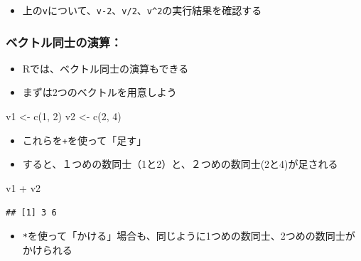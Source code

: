 \documentclass[
]{book}
\newenvironment{Shaded}{\begin{snugshade}}{\end{snugshade}}
\newcommand{\DecValTok}[1]{\textcolor[rgb]{0.00,0.00,0.81}{#1}}
\newcommand{\FunctionTok}[1]{\textcolor[rgb]{0.00,0.00,0.00}{#1}}
\newcommand{\NormalTok}[1]{#1}
\newcommand{\OtherTok}[1]{\textcolor[rgb]{0.56,0.35,0.01}{#1}}
\newcommand{\SpecialCharTok}[1]{\textcolor[rgb]{0.00,0.00,0.00}{#1}}
\providecommand{\tightlist}{%
  \setlength{\itemsep}{0pt}\setlength{\parskip}{0pt}}
\begin{document}
\begin{itemize}
\tightlist
\item
  上の\texttt{v}について、\texttt{v-2}、\texttt{v/2}、\texttt{v\^{}2}の実行結果を確認する
\end{itemize}

\hypertarget{ux30d9ux30afux30c8ux30ebux540cux58ebux306eux6f14ux7b97}{%
\subsubsection*{ベクトル同士の演算：}\label{ux30d9ux30afux30c8ux30ebux540cux58ebux306eux6f14ux7b97}}

\begin{itemize}
\tightlist
\item
  Rでは、ベクトル同士の演算もできる
\item
  まずは2つのベクトルを用意しよう
\end{itemize}

\begin{Shaded}
\begin{Highlighting}[]
\NormalTok{v1 }\OtherTok{\textless{}{-}} \FunctionTok{c}\NormalTok{(}\DecValTok{1}\NormalTok{, }\DecValTok{2}\NormalTok{) }
\NormalTok{v2 }\OtherTok{\textless{}{-}} \FunctionTok{c}\NormalTok{(}\DecValTok{2}\NormalTok{, }\DecValTok{4}\NormalTok{) }
\end{Highlighting}
\end{Shaded}

\begin{itemize}
\tightlist
\item
  これらを\texttt{+}を使って「足す」
\item
  すると、１つめの数同士（1と2）と、２つめの数同士(2と4)が足される
\end{itemize}

\begin{Shaded}
\begin{Highlighting}[]
\NormalTok{v1 }\SpecialCharTok{+}\NormalTok{ v2}
\end{Highlighting}
\end{Shaded}

\begin{verbatim}
## [1] 3 6
\end{verbatim}

\begin{itemize}
\tightlist
\item
  \texttt{*}を使って「かける」場合も、同じように1つめの数同士、2つめの数同士がかけられる
\end{itemize}
\end{document}
